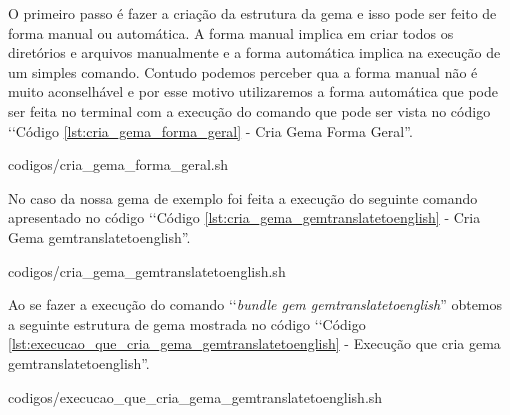 O primeiro passo é fazer a criação da estrutura da gema e isso pode ser feito de forma manual ou automática. 
A forma manual implica em criar todos os diretórios e arquivos manualmente e a forma automática implica na
execução de um simples comando. Contudo podemos perceber qua a forma manual não é muito aconselhável e 
por esse motivo utilizaremos a forma automática que pode ser feita no terminal com a execução do comando
que pode ser vista no código ‘‘Código \ref{lst:cria_gema_forma_geral} - Cria Gema Forma Geral''.


{codigos/cria_gema_forma_geral.sh}

No caso da nossa gema de exemplo foi feita a execução do seguinte comando apresentado no código 
‘‘Código \ref{lst:cria_gema_gemtranslatetoenglish} - Cria Gema gemtranslatetoenglish''.


{codigos/cria_gema_gemtranslatetoenglish.sh}

Ao se fazer a execução do comando ‘‘\emph{bundle gem gemtranslatetoenglish}'' obtemos a seguinte estrutura de gema mostrada 
no código ‘‘Código \ref{lst:execucao_que_cria_gema_gemtranslatetoenglish} - Execução que cria gema gemtranslatetoenglish''.


{codigos/execucao_que_cria_gema_gemtranslatetoenglish.sh}

